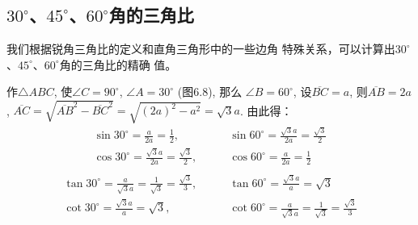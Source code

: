 \subsection{$30^{\circ}$、$45^{\circ}$、$60^{\circ}$角的三角比}
我们根据锐角三角比的定义和直角三角形中的一些边角
特殊关系，可以计算出$30^{\circ}$、$45^{\circ}$、$60^{\circ}$角的三角比的精确
值。

作$\triangle ABC$, 使$\angle C=90^{\circ}$,
$\angle A=30^{\circ}$ (图6.8), 那么
$\angle B=60^{\circ}$, 设$\overline{BC}=a$, 则$\overline{AB}=2a$, $\overline{AC}=\sqrt{\overline{AB}^2-\overline{BC}^2}=
\sqrt{(2a)^2-a^2}=\sqrt{3}a$. 
由此得：
\[\begin{split}
    \sin 30^{\circ}=\frac{a}{2a}=\frac{1}{2},&\qquad \sin 60^{\circ}=\frac{\sqrt{3}a}{2a}=\frac{\sqrt{3}}{2}\\
    \cos 30^{\circ}=\frac{\sqrt{3}a}{2a}=\frac{\sqrt{3}}{2},&\qquad \cos 60^{\circ}=\frac{a}{2a}=\frac{1}{2}\\  
\end{split}\]
\[\begin{split}
    \tan 30^{\circ}=\frac{a}{\sqrt{3}a}=\frac{1}{\sqrt{3}}=\frac{\sqrt{3}}{3},&\qquad \tan 60^{\circ}=\frac{\sqrt{3}a}{a}=\sqrt{3}\\
    \cot 30^{\circ}=\frac{\sqrt{3}a}{a}=\sqrt{3},&\qquad \cot 60^{\circ}=\frac{a}{\sqrt{3}a}=\frac{1}{\sqrt{3}}=\frac{\sqrt{3}}{3}\\  
\end{split}\]

\begin{figure}[htp]\centering
    \begin{minipage}[t]{0.48\textwidth}
    \centering
{}
    \caption{}
    \end{minipage}
    \begin{minipage}[t]{0.48\textwidth}
    \centering
    \caption{}
    \end{minipage}
    \end{figure}

